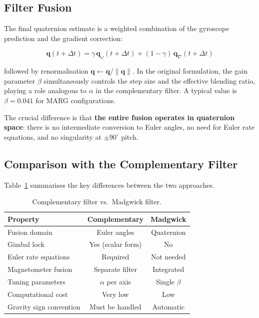 \subsection{Filter Fusion}
\label{sec:madg:fusion}

The final quaternion estimate is a weighted combination of the gyroscope
prediction and the gradient correction:

\begin{equation}
  \boxed{
    \mathbf{q}(t + \Delta t)
    = \gamma\,\mathbf{q}_{\omega}(t + \Delta t)
      + (1 - \gamma)\,\mathbf{q}_{\nabla}(t + \Delta t)
  }
  \label{eq:madg_fusion}
\end{equation}

\noindent followed by renormalisation $\mathbf{q} \leftarrow \mathbf{q} /
\|\mathbf{q}\|$.  In the original formulation, the gain parameter $\beta$
simultaneously controls the step size and the effective blending ratio,
playing a role analogous to $\alpha$ in the complementary filter.  A typical
value is $\beta = 0.041$ for MARG configurations.

The crucial difference is that \textbf{the entire fusion operates in
quaternion space}: there is no intermediate conversion to Euler angles, no
need for Euler rate equations, and no singularity at $\pm 90^\circ$ pitch.

\subsection{Comparison with the Complementary Filter}
\label{sec:madg:comparison}

Table~\ref{tab:cf_vs_madg} summarises the key differences between the two
approaches.

\begin{table}[t]
  \centering
  \caption{Complementary filter vs.\ Madgwick filter.}
  \label{tab:cf_vs_madg}
  \small
  \begin{tabular}{@{}lcc@{}}
    \toprule
    \textbf{Property}
      & \textbf{Complementary}
      & \textbf{Madgwick} \\
    \midrule
    Fusion domain
      & Euler angles
      & Quaternion \\
    Gimbal lock
      & Yes (scalar form)
      & No \\
    Euler rate equations
      & Required
      & Not needed \\
    Magnetometer fusion
      & Separate filter
      & Integrated \\
    Tuning parameters
      & $\alpha$ per axis
      & Single $\beta$ \\
    Computational cost
      & Very low
      & Low \\
    Gravity sign convention
      & Must be handled
      & Automatic \\
    \bottomrule
  \end{tabular}
\end{table}

